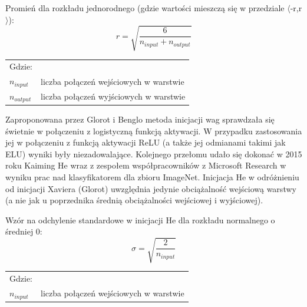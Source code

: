 \documentclass[a4paper,11pt]{article}
\begin{document}
    \smallskip

    \noindent
    \begin{minipage}[H]{\textwidth}
        \setlength\parindent{17pt} Promień dla rozkładu jednorodnego (gdzie wartości mieszczą się w przedziale $\langle$-r,r$\rangle$): \\
        \begin{equation}
            \label{eq:radius_xavier}
            r = \sqrt{\frac{6}{n_{input} + n_{output}}}
        \end{equation}
        \smallskip
        \begin{tabular}{p{}p{}}
            Gdzie: \\
            $n_{input}$  & liczba połączeń wejściowych w warstwie \\
            $n_{output}$ & liczba połączeń wyjściowych w warstwie \\
        \end{tabular}
    \end{minipage}

    \bigskip

    Zaproponowana przez Glorot i Benglo metoda inicjacji wag sprawdzała się świetnie w połączeniu z logistyczną funkcją aktywacji. W przypadku zastosowania jej w połączeniu z funkcją aktywacji ReLU (a także jej odmianami takimi jak ELU) wyniki były niezadowalające. Kolejnego przełomu udało się dokonać w 2015 roku Kaiming He wraz z zespołem współpracowników z Microsoft Research w wyniku prac nad klasyfikatorem dla zbioru ImageNet\cite{DelvingDeepIntoRectifiers2015}. Inicjacja He w odróżnieniu od inicjacji Xaviera (Glorot) uwzględnia jedynie obciążalność wejściową warstwy (a nie jak u poprzednika średnią obciążalności wejściowej i wyjściowej)\cite{UczenieMaszynowe2018}.

    \bigskip

    \noindent
    \begin{minipage}[H]{\textwidth}
        \setlength\parindent{17pt} Wzór na odchylenie standardowe w inicjacji He dla rozkładu normalnego o średniej 0: \\
        \begin{equation}
            \label{eq:std_dev_he}
            \sigma = \sqrt{\frac{2}{n_{input}}}
        \end{equation}
        \smallskip
        \begin{tabular}{p{}p{}}
            Gdzie: \\
            $n_{input}$ & liczba połączeń wejściowych w warstwie \\
        \end{tabular}
    \end{minipage}
\end{document}
